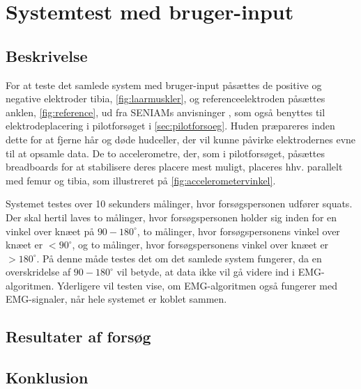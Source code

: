\section{Systemtest med bruger-input}

\subsection{Beskrivelse}
For at teste det samlede system med bruger-input påsættes de positive og negative elektroder tibia, \autoref{fig:laarmuskler}, og referenceelektroden påsættes anklen, \autoref{fig:reference}, ud fra SENIAMs anvisninger \citep{seniam2016}, som også benyttes til elektrodeplacering i pilotforsøget i \autoref{sec:pilotforsoeg}. Huden præpareres inden dette for at fjerne hår og døde hudceller, der vil kunne påvirke elektrodernes evne til at opsamle data. 
De to accelerometre, der, som i pilotforsøget, påsættes breadboards for at stabilisere deres placere mest muligt, placeres hhv. parallelt med femur og tibia, som illustreret på \autoref{fig:accelerometervinkel}.

Systemet testes over 10 sekunders målinger, hvor forsøgspersonen udfører squats. Der skal hertil laves to målinger, hvor forsøgspersonen holder sig inden for en vinkel over knæet på $90-180^{\circ}$, to målinger, hvor forsøgspersonens vinkel over knæet er $<90^{\circ}$, og to målinger, hvor forsøgspersonens vinkel over knæet er $>180^{\circ}$. På denne måde testes det om det samlede system fungerer, da en overskridelse af $90-180^{\circ}$ vil betyde, at data ikke vil gå videre ind i EMG-algoritmen. Yderligere vil testen vise, om EMG-algoritmen også fungerer med EMG-signaler, når hele systemet er koblet sammen. 

\subsection{Resultater af forsøg}


\subsection{Konklusion}
